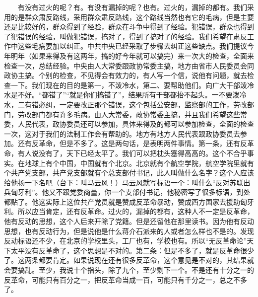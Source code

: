 \documentclass[cn,11pt,chinese]{elegantbook}
\begin{document}
　　有没有过火的呢？有。有没有漏掉的呢？也有。过火的，漏掉的都有。我们采用的是群众肃反路线，采用群众肃反路线，这个路线当然也有它的毛病，但是主要还是比较好的，群众得到了经验，群众在斗争中得到了经验。犯错误，群众也得到了犯错误的经验，叫做犯错误，搞对了，得到了搞对了的经验。我们希望在肃反工作中这些毛病要加以纠正。中共中央已经采取了步骤去纠正这些缺点。我们提议今年明年（如果来得及有这两年，搞的好今年就可以搞完）来一次大的检查，全面来检查一次，总结经验。中央由人大常委跟政协常委主搞，地方由省市人民委员会同政协主搞。个别的检查，不见得会有效力的，有人写一个信，说他有问题，就去检查一下。我们现在的目的是第一，不泼冷水，第二、要帮助他们。向广大干部泼冷水是不好。“都错了”“就是你们搞错了”，结果所有干部都抬不起头。一不要泼冷水，二有错必纠，一定要改正那个错误，这个包括公安部，监察部的工作，劳改部门，劳改部门都有许多毛病。由人大常委，政协常委主搞，并且我们希望这些常委，人民代表，政协委员还可以参加，具体来得及的都可以参加检查，全面的检查一次，这对于我们的法制工作会有帮助的。地方有地方人民代表跟政协委员去参加。还有反革命，但是不多了。这是两句话，是表明两件事情。第一条，还有反革命，有人说没有了，天下已经太平了。我们可以把枕头塞得高高的。这个不合乎事实。在地球上有个中国，中国就有个北京。北京就有个航空学院，航空学院里就有个共产党支部，共产党支部就有个总支部付书记，此人叫做什么名字？这个人应该给他扬一下名吧（台下：叫马云风！）马云风就写标语一个：叫什么“反对苏联出兵匈牙利”。他又不跟党委商量，你一个支部付书记，他秘密写了很多标语，到处都贴了。他这实际上这位共产党员就是赞成反革命暴动，赞成西方国家去援助匈牙利。所以应当肯定，还有反革命。过火的，漏掉的都有，这种人不一定是反革命，他有反动的思想，这个人后来开除了党籍。但是还留他在那里读书。因为他有反动思想，也有反动行为，但是说他是什么蒋介石派来的人或者怎么样也不是的。发现反动标语还不少，在北京的学校里头，工厂也有，学校也有。所以“无反革命论”天下太平没有反革命了，这个思想是不对的。第二条：但是不多了，就是反革命很少了。这两条都要肯定。如果说现在还有很多反革命，这个意见是不对的，其结果就会要搞乱。至少，我说十个指头，除了九个，至少剩下一个。不是还有十分之一的反革命，可能只有百分之一，把反革命当成一百，可能只有千分之一，总之不多了。\\
\end{document}
